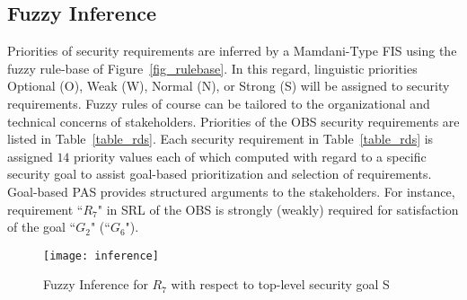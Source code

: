 \subsection{Fuzzy Inference}
\label{pas_prior_inference}

Priorities of security requirements are inferred by a Mamdani-Type \cite{mamdani1974application} FIS using the fuzzy rule-base of Figure~\ref{fig_rulebase}. In this regard, linguistic priorities Optional (O), Weak (W), Normal (N), or Strong (S) will be assigned to security requirements. Fuzzy rules of course can be tailored to the organizational and technical concerns of stakeholders. Priorities of the OBS security requirements are listed in Table~\ref{table_rds}. Each security requirement in Table~\ref{table_rds} is assigned $ 14 $ priority values each of which computed with regard to a specific security goal to assist goal-based prioritization and selection of requirements. Goal-based PAS provides structured arguments to the stakeholders. For instance, requirement ``$R_7$" in SRL of the OBS is strongly (weakly) required for satisfaction of the goal ``$G_2$" (``$G_6$"). %

\begin{figure}[!htbp]
	\centering
	\centerline{\texttt{[image: inference]}}
	\caption{Fuzzy Inference for $R_7$ with respect to top-level security goal S}
	\label{fig_inference}
\end{figure}
\vspace{-1em}
%	
